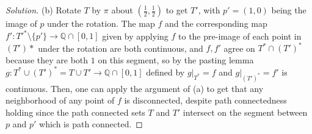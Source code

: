 \documentclass[10pt]{article}
\providecommand{\half}{\frac{1}{2}}
\providecommand{\QQ}{\mathbb Q}
\newenvironment{soln}{\begin{proof}[Solution]}{\end{proof}}
\begin{document}
\begin{soln}
    (b) Rotate $T$ by $\pi$ about $(\half,\half)$ to get $T'$,
    with $p' = (1,0)$ being the image of $p$ under the rotation.
    The map $f$ and the corresponding map
    $f'\colon T'^*\setminus\{p'\}\to\QQ\cap[0,1]$
    given by applying $f$ to the pre-image of each point in $(T')*$
    under the rotation are both continuous, and $f,f'$ agree on $T^*\cap (T')^*$
    because they are both $1$ on this segment, so by the pasting lemma
    $g\colon T^*\cup (T')^* = T\cup T'\to \QQ\cap[0,1]$
    defined by $g|_{T^*} = f$ and $g|_{(T')^*} = f'$ is continuous.
    Then, one can apply the argument of (a) to get that
    any neighborhood of any point of $f$ is disconnected, despite
    path connectedness holding since the path connected sets $T$ and $T'$
    intersect on the segment between $p$ and $p'$ which is path connected.
\end{soln}
\end{document}

